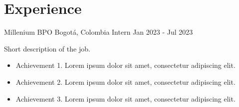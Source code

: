 \section*{Experience}
\begin{entrylist}
    \entry
    {Millenium BPO}
    {Bogotá, Colombia}
    {Intern}
    {Jan 2023 - Jul 2023}
    {Short description of the job.
        \begin{itemize}
            \item Achievement 1. Lorem ipsum dolor sit amet, consectetur adipiscing elit.
            \item Achievement 2. Lorem ipsum dolor sit amet, consectetur adipiscing elit.
            \item Achievement 3. Lorem ipsum dolor sit amet, consectetur adipiscing elit.
        \end{itemize}
    }
\end{entrylist}